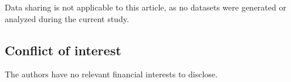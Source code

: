 \documentclass[12pt,reqno,twoside]{amsart}
\theoremstyle{definition}
\theoremstyle{plain}
\theoremstyle{remark}
\numberwithin{equation}{section}
\begin{document}
Data sharing is not applicable to this article, as no datasets were generated or analyzed during the current study.

\subsection*{Conflict of interest}

The authors have no relevant financial interests to disclose.



\end{document}
